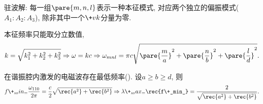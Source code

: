 \documentclass[hidelinks]{ctexart}
\begin{document}
\begin{cenum}
    \item 驻波解: 每一组$\pare{m,n,l}$表示一种本征模式, 对应两个独立的偏振模式($A_1:A_2:A_3$), 除非其中一个$\+vk$分量为零.
    \item 本征频率只能取分立数值,
    \[ k = \sqrt{k_1^2 + k_2^2 + k_3^2} \Rightarrow \omega = kc \Rightarrow \omega_{mnl} = \pi c\sqrt{\pare{\frac{m}{a}}^2 + \pare{\frac{n}{b}}^2 + \pare{\frac{l}{d}}^2}. \]
    \item 在谐振腔内激发的电磁波存在最低频率(). 设$a\ge b\ge d$, 则
    \[ f\+_min_ = \frac{\omega_{110}}{2\pi} = \frac{c}{2}\sqrt{\rec{a^2} + \rec{b^2}} \Rightarrow \lambda\+_max_ = \rec{f\+_min_} = \frac{2}{\displaystyle \sqrt{\rec{a^2} + \rec{b^2}}}. \]
\end{cenum}



\end{document}
